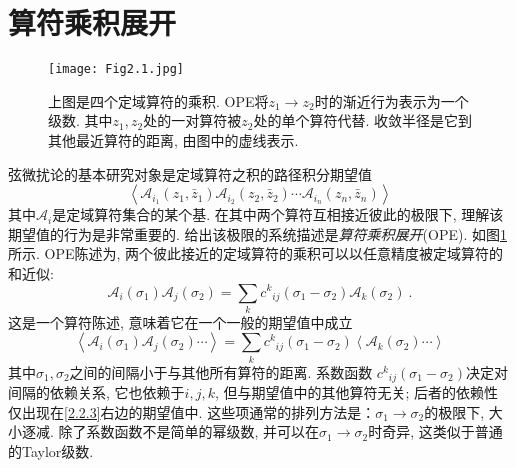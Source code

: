 \section{\texorpdfstring{算符乘积展开}{2.2 The operator product expansion}}

\begin{figure}
	\begin{center}
		\texttt{[image: Fig2.1.jpg]}
\caption{上图是四个定域算符的乘积. OPE将$z_1 \to z_2$时的渐近行为表示为一个级数. 其中$z_1 , z_2$处的一对算符被$z_2$处的单个算符代替. 收敛半径是它到其他最近算符的距离, 由图中的虚线表示.}\label{Fig2.1}
	\end{center}
\end{figure}

弦微扰论的基本研究对象是定域算符之积的路径积分期望值
\begin{equation}
\left\langle\mathscr{A}_{i_{1}}(z_{1}, \bar{z}_{1}) \mathscr{A}_{i_{2}}(z_{2}, \bar{z}_{2}) \cdots \mathscr{A}_{i_{n}}(z_{n}, \bar{z}_{n})\right\rangle
\end{equation}
其中$\mathscr{A}_{i}$是定域算符集合的某个基. 在其中两个算符互相接近彼此的极限下, 理解该期望值的行为是非常重要的. 给出该极限的系统描述是\emph{算符乘积展开}(OPE). 
如图\ref{Fig2.1}所示. 
OPE陈述为, 两个彼此接近的定域算符的乘积可以以任意精度被定域算符的和近似:
\begin{equation}
\mathscr{A}_{i}(\sigma_{1}) \mathscr{A}_{j}(\sigma_{2})=\sum_{k} c^{k}{}_{i j}(\sigma_{1}-\sigma_{2}) \mathscr{A}_{k}(\sigma_{2}) \:. \label{2.2.2}
\end{equation}
这是一个算符陈述, 意味着它在一个一般的期望值中成立
\begin{equation}
\left\langle\mathscr{A}_{i}(\sigma_{1}) \mathscr{A}_{j}(\sigma_{2}) \cdots\right\rangle
=\sum_{k} c^{k}{}_{i j}(\sigma_{1}-\sigma_{2})\left\langle\mathscr{A}_{k}\left(\sigma_{2}\right) \cdots\right\rangle \label{2.2.3}
\end{equation}
其中$\sigma_{1},\sigma_{2}$之间的间隔小于与其他所有算符的距离. 系数函数 $c^{k}{ }_{i j}(\sigma_{1}-\sigma_{2})$决定对间隔的依赖关系, 它也依赖于$i,j,k$, 但与期望值中的其他算符无关; 后者的依赖性仅出现在\eqref{2.2.3}右边的期望值中. 这些项通常的排列方法是：$\sigma_{1} \rightarrow \sigma_{2}$的极限下, 大小逐减. 除了系数函数不是简单的幂级数, 并可以在$\sigma_{1} \rightarrow \sigma_{2}$时奇异, 这类似于普通的Taylor级数.

